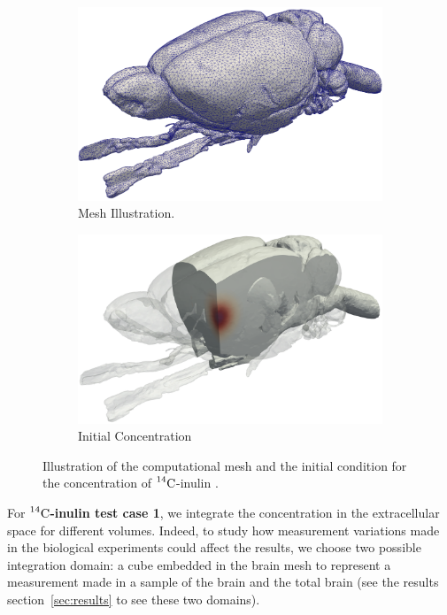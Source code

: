 \documentclass[10pt,letterpaper]{article}
\newcommand{\1}{^{(1)}}
\newcommand{\2}{^{(2)}}
\newcommand{\Cinulin}{$\prescript{14}{}{\text{C}}$-inulin }
\begin{document}
\begin{figure}[htb]
    \centering
    \begin{subfigure}[t]{0.45\textwidth}
        \centering
        \includegraphics[width=\textwidth]{images/poster/ratbrain-mesh64-cropped.pdf}
        \caption{Mesh Illustration.}
    \end{subfigure}
    \hfill
    \begin{subfigure}[t]{0.45\textwidth}
        \centering
        \includegraphics[width=\textwidth]{images/poster/ratbrain-initial-concentration-cropped.pdf}
        \caption{Initial Concentration}
    \end{subfigure}
    \hfill
    \caption{Illustration of the computational mesh and the initial condition for the concentration of \Cinulin.}
    \label{fig:mesh-illustration}
\end{figure}

For \textbf{\Cinulin test case 1}, we integrate the concentration in the extracellular space for different volumes. Indeed, to study how measurement variations made in the biological experiments could affect the results, we choose two possible integration domain: a cube embedded in the brain mesh to represent a measurement made in a sample of the brain and the total brain (see the results section~\ref{sec:results} to see these two domains). 
\end{document}
